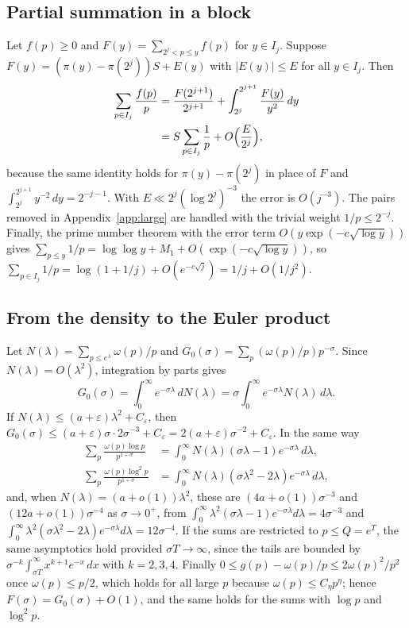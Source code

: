 \documentclass[aps,prd,twocolumn,superscriptaddress,nofootinbib,longbibliography,floatfix,showkeys,nobalancelastpage,amsmath,amssymb,10pt]{revtex4-2}
\theoremstyle{plain}
\theoremstyle{definition}
\theoremstyle{plain}
\newcommand{\eps}{\varepsilon}
\begin{document}
\subsection{Partial summation in a block}\label{app:block}

Let $f(p)\ge0$ and $F(y)=\sum_{2^j<p\le y}f(p)$ for $y\in I_j$. Suppose $F(y)=(\pi(y)-\pi(2^j))S+E(y)$ with $|E(y)|\le E$ for all $y\in I_j$. Then
\begin{align*}
\sum_{p\in I_j}\frac{f(p)}p&=\frac{F(2^{j+1})}{2^{j+1}}+\int_{2^j}^{2^{j+1}}\frac{F(y)}{y^2}\,dy\\
&=S\sum_{p\in I_j}\frac1p+O\Bigl(\frac E{2^j}\Bigr),
\end{align*}
because the same identity holds for $\pi(y)-\pi(2^j)$ in place of $F$ and $\int_{2^j}^{2^{j+1}}y^{-2}\,dy=2^{-j-1}$. With $E\ll2^j(\log2^j)^{-3}$ the error is $O(j^{-3})$. The pairs removed in Appendix~\ref{app:large} are handled with the trivial weight $1/p\le2^{-j}$. Finally, the prime number theorem with the error term $O(y\exp(-c\sqrt{\log y}))$ gives $\sum_{p\le y}1/p=\log\log y+M_1+O(\exp(-c\sqrt{\log y}))$, so $\sum_{p\in I_j}1/p=\log(1+1/j)+O(e^{-c\sqrt j})=1/j+O(1/j^2)$.

\subsection{From the density to the Euler product}\label{app:abel}

Let $N(\lambda)=\sum_{p\le e^\lambda}\omega(p)/p$ and $G_0(\sigma)=\sum_p(\omega(p)/p)p^{-\sigma}$. Since $N(\lambda)=O(\lambda^2)$, integration by parts gives
\[
G_0(\sigma)=\int_0^\infty e^{-\sigma\lambda}\,dN(\lambda)=\sigma\int_0^\infty e^{-\sigma\lambda}N(\lambda)\,d\lambda.
\]
If $N(\lambda)\le(a+\eps)\lambda^2+C_\eps$, then $G_0(\sigma)\le(a+\eps)\sigma\cdot2\sigma^{-3}+C_\eps=2(a+\eps)\sigma^{-2}+C_\eps$. In the same way
\begin{align*}
\sum_p\frac{\omega(p)\log p}{p^{1+\sigma}}&=\int_0^\infty N(\lambda)(\sigma\lambda-1)e^{-\sigma\lambda}\,d\lambda,\\
\sum_p\frac{\omega(p)\log^2p}{p^{1+\sigma}}&=\int_0^\infty N(\lambda)(\sigma\lambda^2-2\lambda)e^{-\sigma\lambda}\,d\lambda,
\end{align*}
and, when $N(\lambda)=(a+o(1))\lambda^2$, these are $(4a+o(1))\sigma^{-3}$ and $(12a+o(1))\sigma^{-4}$ as $\sigma\to0^+$, from $\int_0^\infty\lambda^2(\sigma\lambda-1)e^{-\sigma\lambda}d\lambda=4\sigma^{-3}$ and $\int_0^\infty\lambda^2(\sigma\lambda^2-2\lambda)e^{-\sigma\lambda}d\lambda=12\sigma^{-4}$. If the sums are restricted to $p\le Q=e^T$, the same asymptotics hold provided $\sigma T\to\infty$, since the tails are bounded by $\sigma^{-k}\int_{\sigma T}^\infty x^{k+1}e^{-x}\,dx$ with $k=2,3,4$. Finally $0\le g(p)-\omega(p)/p\le2\omega(p)^2/p^2$ once $\omega(p)\le p/2$, which holds for all large $p$ because $\omega(p)\le C_\eta p^\eta$; hence $F(\sigma)=G_0(\sigma)+O(1)$, and the same holds for the sums with $\log p$ and $\log^2p$.
\end{document}
